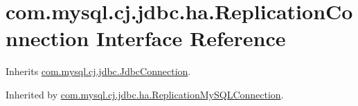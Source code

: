 \hypertarget{interfacecom_1_1mysql_1_1cj_1_1jdbc_1_1ha_1_1_replication_connection}{}\section{com.\+mysql.\+cj.\+jdbc.\+ha.\+Replication\+Connection Interface Reference}
\label{interfacecom_1_1mysql_1_1cj_1_1jdbc_1_1ha_1_1_replication_connection}


Inherits \mbox{\hyperlink{interfacecom_1_1mysql_1_1cj_1_1jdbc_1_1_jdbc_connection}{com.\+mysql.\+cj.\+jdbc.\+Jdbc\+Connection}}.



Inherited by \mbox{\hyperlink{classcom_1_1mysql_1_1cj_1_1jdbc_1_1ha_1_1_replication_my_s_q_l_connection}{com.\+mysql.\+cj.\+jdbc.\+ha.\+Replication\+My\+S\+Q\+L\+Connection}}.

